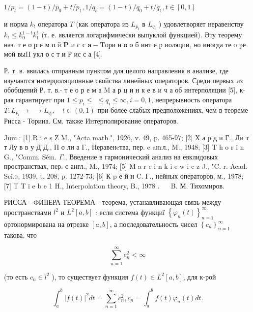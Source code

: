 \documentclass[10pt]{article}
\begin{document}
$1 / p_{t}=(1-t) / p_{0}+t / p_{1}, 1 / q_{t}=(1-t) / q_{0}+t / q_{1}, t \in[0,1]$



и норма $k_{t}$ оператора $T$ (как оператора из $L_{p_{t}}$ в $L_{q_{t}}$ ) удовлетворяет неравенству $k_{t} \leqslant k_{0}^{1-t} k_{1}^{t}$ (т. е. является логарифмически выпуклой функцией). Әту теорему наз. т е о р е м о й $\mathbf{P}$ и с с $\mathbf{a}-\mathrm{T} о р и$ и о о б инт е р иоляции, но иногда те о ре мой выII укл о с т и $\mathbf{Р}$ ис с а [4].



Р. т. в. явилась отправным пунктом для целого направления в анализе, где изучаются интерџоляционные свойства линейных операторов. Среди первых из обобщений Р. т. в.- т е о р е м а $\mathrm{M}$ а р ц и н к е в и ч а об интерполяции [5], к-рая гарантирует при $1 \leqslant p_{i} \leqslant$ $\leqslant q_{i} \leqslant \infty, i=0,1$, непрерывность оператора $T: L_{p_{t}} \rightarrow$ $\rightarrow L_{q_{t}}, \quad t \in(0,1)$ при более слабых предположениях, чем в теореме Рисса - Торина. См. также Интерполирование операторов.



Jum.: [1] R i e s Z M., "Acta math.", 1926, v. 49, p. 465-97; [2] Х а р д и Г., Ли т т Лу в в у Д Д., П о ли а Г., Неравенcтва, пер. c aнrл., M., 1948; [3] T h o r i n G., "Comm. Sém. $\Gamma$., Введение в гармонический анализ на евклидовых пространствах, пер. с англ., M., 1974; [5] M a r c i n k i e w i c z J., "C. r. Acad. Sci.», 1939, t. 208, p. 1272-73; [6] К p е й н C. Г., нейных операторов, м., 1978; [7] T $\mathrm{T}$ i e b e 1 H., Interpolation theory, B., 1978 . $\quad$ B. М. Тихомиров.



РИССА - ФИІІЕРА ТЕОРЕМА - теорема, устанавливающая связь между пространствами $l^{2}$ и $L^{2}[a, b]$ : если система функциї $\left\{\varphi_{n}(t)\right\}_{n=1}^{\infty}$ ортонормирована на отрезке $[a, b]$, а последовательность чисел $\left\{c_{n}\right\}_{n=1}^{\infty}$ такова, что



\[

\sum_{n=1}^{\infty} c_{n}^{2}<\infty

\]



(то есть $c_{n} \in l^{2}$ ), то существует функция $f(t) \in L^{2}[a, b]$, для к-рой



\[

\int_{a}^{b}|f(t)|^{2} d t=\sum_{n=1}^{\infty} c_{n}^{2}, c_{n}=\int_{a}^{b} f(t) \varphi_{n}(t) d t .

\]
\end{document}
